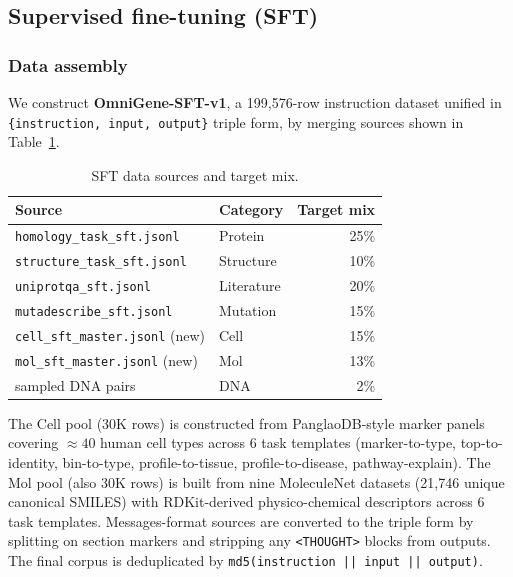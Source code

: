 \documentclass[11pt]{article}
\begin{document}
\subsection{Supervised fine-tuning (SFT)}

\subsubsection{Data assembly}

We construct \textbf{OmniGene-SFT-v1}, a 199{,}576-row instruction dataset unified in \texttt{\{instruction, input, output\}} triple form, by merging sources shown in Table~\ref{tab:sft-data}.

\begin{table}[H]
\centering
\small
\caption{SFT data sources and target mix.}
\label{tab:sft-data}
\begin{tabular}{llr}
\toprule
\textbf{Source} & \textbf{Category} & \textbf{Target mix} \\
\midrule
\texttt{homology\_task\_sft.jsonl}    & Protein     & 25\% \\
\texttt{structure\_task\_sft.jsonl}   & Structure   & 10\% \\
\texttt{uniprotqa\_sft.jsonl}         & Literature  & 20\% \\
\texttt{mutadescribe\_sft.jsonl}      & Mutation    & 15\% \\
\texttt{cell\_sft\_master.jsonl} (new) \citep{franzen2019panglaodb} & Cell  & 15\% \\
\texttt{mol\_sft\_master.jsonl} (new) \citep{wu2018moleculenet}  & Mol   & 13\% \\
sampled DNA pairs                     & DNA         & 2\%  \\
\bottomrule
\end{tabular}
\end{table}

The Cell pool (30K rows) is constructed from PanglaoDB-style \citep{franzen2019panglaodb} marker panels covering $\approx 40$ human cell types across 6 task templates (marker-to-type, top-to-identity, bin-to-type, profile-to-tissue, profile-to-disease, pathway-explain). The Mol pool (also 30K rows) is built from nine MoleculeNet \citep{wu2018moleculenet} datasets (21{,}746 unique canonical SMILES) with RDKit-derived physico-chemical descriptors across 6 task templates. Messages-format sources are converted to the triple form by splitting on section markers and stripping any \texttt{<THOUGHT>} blocks from outputs. The final corpus is deduplicated by \texttt{md5(instruction || input || output)}.
\end{document}
